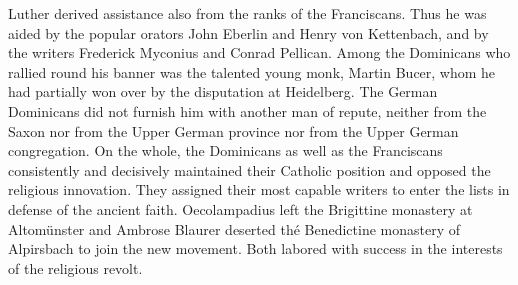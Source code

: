 Luther derived assistance also from the ranks of the Franciscans.
Thus he was aided by the popular orators John Eberlin and Henry
von Kettenbach, and by the writers Frederick Myconius and Conrad
Pellican. Among the Dominicans who rallied round his banner was
the talented young monk, Martin Bucer, whom he had partially
won over by the disputation at Heidelberg. The German Dominicans
did not furnish him with another man of repute, neither from the
Saxon nor from the Upper German province nor from the Upper
German congregation. On the whole, the Dominicans as well as the
Franciscans consistently and decisively maintained their Catholic position
and opposed the religious innovation. They assigned their most
capable writers to enter the lists in defense of the ancient faith.
Oecolampadius left the Brigittine monastery at Altomünster and
Ambrose Blaurer deserted thé Benedictine monastery of Alpirsbach to
join the new movement. Both labored with success in the interests of
the religious revolt.

